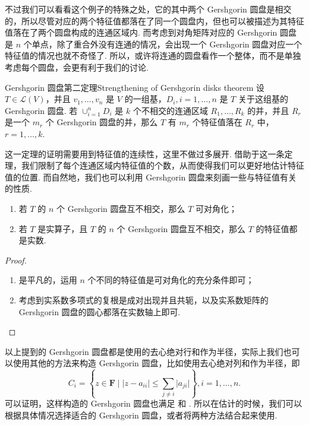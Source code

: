 不过我们可以看看这个例子的特殊之处，它的其中两个 Gershgorin 圆盘是相交的，所以尽管对应的两个特征值都落在了同一个圆盘内，但也可以被描述为其特征值落在了两个圆盘构成的连通区域内. 而考虑到对角矩阵对应的 Gershgorin 圆盘是 $n$ 个单点，除了重合外没有连通的情况，会出现一个 Gershgorin 圆盘对应一个特征值的情况也就不奇怪了. 所以，或许将连通的圆盘看作一个整体，而不是单独考虑每个圆盘，会更有利于我们的讨论.

\begin{theorem}{Gershgorin 圆盘第二定理}{Strengthening of Gershgorin disks theorem}
    设 $T \in \mathcal{L}(V)$，并且 $v_1, \ldots, v_n$ 是 $V$ 的一组基，$D_i, i = 1, \ldots, n$ 是 $T$ 关于这组基的 Gershgorin 圆盘. 若 $\cup_{i = 1}^n D_i$ 是 $k$ 个不相交的连通区域 $R_1, \ldots, R_k$ 的并，并且 $R_r$ 是一个 $m_r$ 个 Gershgorin 圆盘的并，那么 $T$ 有 $m_r$ 个特征值落在 $R_r$ 中，$r = 1, \ldots, k$.
\end{theorem}

这一定理的证明需要用到特征值的连续性，这里不做过多展开. 借助于这一条定理，我们限制了每个连通区域内特征值的个数，从而使得我们可以更好地估计特征值的位置. 而自然地，我们也可以利用 Gershgorin 圆盘来刻画一些与特征值有关的性质.

\begin{corollary}{}{}
    \begin{enumerate}
        \item 若 $T$ 的 $n$ 个 Gershgorin 圆盘互不相交，那么 $T$ 可对角化；
        \item 若 $T$ 是实算子，且 $T$ 的 $n$ 个 Gershgorin 圆盘互不相交，那么 $T$ 的特征值都是实数.
    \end{enumerate}
\end{corollary}

\begin{proof}
    \begin{enumerate}
        \item 是平凡的，运用 $n$ 个不同的特征值是可对角化的充分条件即可；
        \item 考虑到实系数多项式的复根是成对出现并且共轭，以及实系数矩阵的 Gershgorin 圆盘的圆心都落在实数轴上即可.
    \end{enumerate}
\end{proof}

以上提到的 Gershgorin 圆盘都是使用的去心绝对行和作为半径，实际上我们也可以使用其他的方法来构造 Gershgorin 圆盘，比如使用去心绝对列和作为半径，即 \[
    C_i = \left\{z \in \mathbf{F} \mid \lvert z - a_{ii} \rvert \leqslant \sum_{j \neq i} \lvert a_{ji} \rvert\right\}, i = 1, \ldots, n.
\]
可以证明，这样构造的 Gershgorin 圆盘也满足 和 . 所以在估计的时候，我们可以根据具体情况选择适合的 Gershgorin 圆盘，或者将两种方法结合起来使用.

